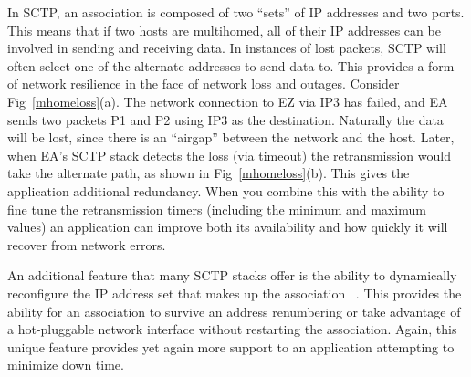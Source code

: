 \documentclass[conference]{IEEEtran}
\begin{document}
In SCTP, an association is composed of two ``sets'' of IP addresses and two ports. This
means that if two hosts are multihomed, all of their IP addresses can be involved
in sending and receiving data. In instances of lost packets, SCTP will often select
one of the alternate addresses to send data to. This provides a form of network 
resilience in the face of network loss and outages. Consider Fig~\ref{mhomeloss}(a).
The network connection to EZ via IP3 has failed, and EA sends two packets P1 and P2 using
IP3 as the destination. Naturally the data will be lost, since there is an ``airgap''
between the network and the host. Later, when EA's SCTP stack detects the loss (via timeout)
the retransmission would take the alternate path, as shown in Fig~\ref{mhomeloss}(b). This gives
the application additional redundancy. When you combine this with the ability to fine tune
the retransmission timers (including the minimum and maximum values) an 
application can improve both its availability and how quickly it will recover from
network errors.

An additional feature that many SCTP stacks offer is the ability to dynamically 
reconfigure the IP address set that makes up the association ~\cite{rfc5061}. This
provides the ability for an association to survive an address renumbering or take
advantage of a hot-pluggable network interface without restarting the 
association. Again, this unique feature provides yet again more support 
to an application attempting to minimize down time.
\end{document}
